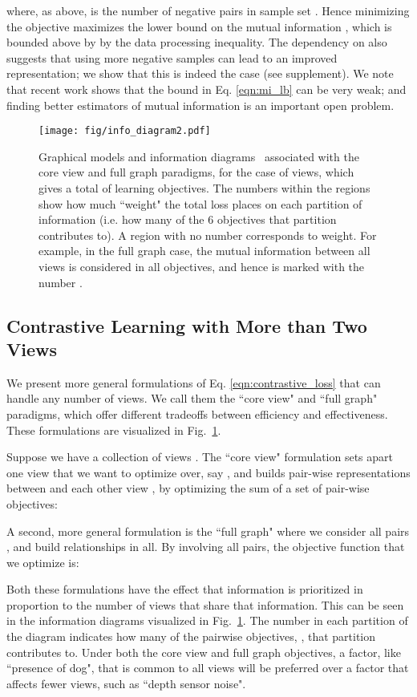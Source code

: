 \documentclass[10pt,twocolumn,letterpaper]{article}
\newcommand{\citep}[1]{\cite{#1}}
\begin{document}
where, as above,  is the number of negative pairs in sample set . Hence minimizing the objective  maximizes the lower bound on the mutual information , which is bounded above by  by the data processing inequality. The dependency on  also suggests that using more negative samples can lead to an improved representation; we show that this is indeed the case (see supplement). We note that recent work \citep{mcallester2018formal} shows that the bound in Eq. \ref{eqn:mi_lb} can be very weak; and finding better estimators of mutual information is an important open problem. \begin{figure}[t]
\centering
\texttt{[image: fig/info\_diagram2.pdf]}
\caption{\small{Graphical models and information diagrams~\citep{infdiag} associated with the core view and full graph paradigms, for the case of  views, which gives a total of  learning objectives. The numbers within the regions show how much ``weight" the total loss places on each partition of information (i.e. how many of the 6 objectives that partition contributes to). A region with no number corresponds to  weight. For example, in the full graph case, the mutual information between all  views is considered in all  objectives, and hence is marked with the number .}}
\label{fig:info_diagram}
\vspace{-10pt}
\end{figure} \subsection{Contrastive Learning with More than Two Views}
\label{sec:method_more_view}

We present more general formulations of Eq. \ref{eqn:contrastive_loss} that can handle any number of views. We call them the ``core view" and ``full graph" paradigms, which offer different tradeoffs between efficiency and effectiveness. These formulations are visualized in Fig.~\ref{fig:info_diagram}.

Suppose we have a collection of  views . The ``core view" formulation sets apart one view that we want to optimize over, say , and builds pair-wise representations between  and each other view , by optimizing the sum of a set of pair-wise objectives:

A second, more general formulation is the ``full graph" where we consider all pairs , and build 
relationships in all. By involving all pairs, the objective function that we optimize is:

Both these formulations have the effect that information is prioritized in proportion to the number of views that share that information. This can be seen in the information diagrams visualized in Fig.~\ref{fig:info_diagram}. The number in each partition of the diagram indicates how many of the pairwise objectives, , that partition contributes to. Under both the core view and full graph objectives, a factor, like ``presence of dog", that is common to all views will be preferred over a factor that affects fewer views, such as ``depth sensor noise".
\end{document}
